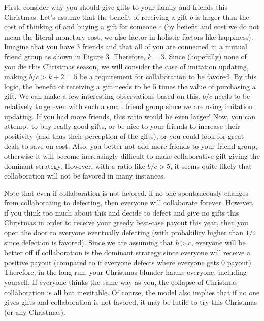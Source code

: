 \documentclass[11pt]{article}
\begin{document}
First, consider why you should give gifts to your family and friends this Christmas. Let's assume that the benefit of receiving a gift $b$ is larger than the cost of thinking of and buying a gift for someone $c$ (by benefit and cost we do not mean the literal monetary cost; we also factor in holistic factors like happiness). Imagine that you have 3 friends and that all of you are connected in a mutual friend group as shown in Figure 3. Therefore, $k = 3$. Since (hopefully) none of you die this Christmas season, we will consider the case of imitation updating, making $ b / c > k + 2 = 5$ be a requirement for collaboration to be favored. By this logic, the benefit of receiving a gift needs to be 5 times the value of purchasing a gift. We can make a few interesting observations based on this. $b/c$ needs to be relatively large even with such a small friend group since we are using imitation updating. If you had more friends, this ratio would be even larger! Now, you can attempt to buy really good gifts, or be nice to your friends to increase their positivity (and thus their perception of the gifts), or you could look for great deals to save on cost. Also, you better not add more friends to your friend group, otherwise it will become increasingly difficult to make collaborative gift-giving the dominant strategy. However, with a ratio like $b/c > 5$, it seems quite likely that collaboration will not be favored in many instances. 

Note that even if collaboration is not favored, if no one spontaneously changes from collaborating to defecting, then everyone will collaborate forever. However, if you think too much about this and decide to defect and give no gifts this Christmas in order to receive your greedy best-case payout this year, then you open the door to everyone eventually defecting (with probability higher than $1/4$ since defection is favored). Since we are assuming that $b > c$, everyone will be better off if collaboration is the dominant strategy since everyone will receive a positive payout (compared to if everyone defects where everyone gets 0 payout). Therefore, in the long run, your Christmas blunder harms everyone, including yourself. If everyone thinks the same way as you, the collapse of Christmas collaboration is all but inevitable. Of course, the model also implies that if no one gives gifts and collaboration is not favored, it may be futile to try this Christmas (or any Christmas). 
\end{document}
